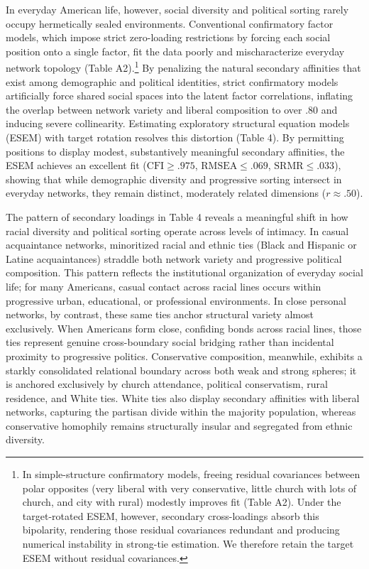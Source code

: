 \documentclass[
  12pt
]{article}
\begin{document}
In everyday American life, however, social diversity and political sorting rarely occupy hermetically sealed environments. Conventional confirmatory factor models, which impose strict zero-loading restrictions by forcing each social position onto a single factor, fit the data poorly and mischaracterize everyday network topology (Table A2).\footnote{In simple-structure confirmatory models, freeing residual covariances between polar opposites (very liberal with very conservative, little church with lots of church, and city with rural) modestly improves fit (Table A2). Under the target-rotated ESEM, however, secondary cross-loadings absorb this bipolarity, rendering those residual covariances redundant and producing numerical instability in strong-tie estimation. We therefore retain the target ESEM without residual covariances.} By penalizing the natural secondary affinities that exist among demographic and political identities, strict confirmatory models artificially force shared social spaces into the latent factor correlations, inflating the overlap between network variety and liberal composition to over .80 and inducing severe collinearity. Estimating exploratory structural equation models (ESEM) with target rotation resolves this distortion (Table 4). By permitting positions to display modest, substantively meaningful secondary affinities, the ESEM achieves an excellent fit ($\text{CFI} \ge .975$, $\text{RMSEA} \le .069$, $\text{SRMR} \le .033$), showing that while demographic diversity and progressive sorting intersect in everyday networks, they remain distinct, moderately related dimensions ($r \approx .50$).

The pattern of secondary loadings in Table 4 reveals a meaningful shift in how racial diversity and political sorting operate across levels of intimacy. In casual acquaintance networks, minoritized racial and ethnic ties (Black and Hispanic or Latine acquaintances) straddle both network variety and progressive political composition. This pattern reflects the institutional organization of everyday social life; for many Americans, casual contact across racial lines occurs within progressive urban, educational, or professional environments. In close personal networks, by contrast, these same ties anchor structural variety almost exclusively. When Americans form close, confiding bonds across racial lines, those ties represent genuine cross-boundary social bridging rather than incidental proximity to progressive politics. Conservative composition, meanwhile, exhibits a starkly consolidated relational boundary across both weak and strong spheres; it is anchored exclusively by church attendance, political conservatism, rural residence, and White ties. White ties also display secondary affinities with liberal networks, capturing the partisan divide within the majority population, whereas conservative homophily remains structurally insular and segregated from ethnic diversity.
\end{document}
